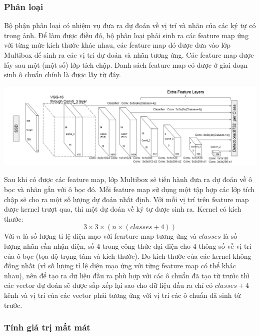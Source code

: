 \documentclass[a4paper,12pt]{article}
\begin{document}
	\subsubsection* {Phân loại}
	
	Bộ phận phân loại có nhiệm vụ đưa ra dự đoán về vị trí và nhãn của các ký tự có trong ảnh. Để làm được điều đó, bộ phân loại phải sinh ra các feature map ứng với từng mức kích thước khác nhau, các feature map đó được đưa vào lớp Multibox để sinh ra các vị trí dự đoán và nhãn tương ứng. Các feature map được lấy sau một (một số) lớp tích chập. Danh sách feature map có được ở giai đoạn sinh ô chuẩn chính là được lấy từ đây. \\
	
	\begin{center}
		
		\centering
		\includegraphics[width=0.8\linewidth]{SSD_Struture.png}
		\vspace{0.5cm}
	\end{center}
	
	Sau khi có được các feature map, lớp Multibox sẽ tiến hành đưa ra dự đoán về ô bọc và nhãn gắn với ô bọc đó. Mỗi feature map sử dụng một tập hợp các lớp tích chập sẽ cho ra một số lượng dự đoán nhất định. Với mỗi vị trí trên feature map được kernel trượt qua, thì một dự đoán về ký tự được sinh ra. Kernel có kích thước:
	$$3 \times 3 \times (n \times (classes + 4))$$
	Với $n$ là số lượng tỉ lệ diện mạo với fearture map tương ứng và $classes$ là số lượng nhãn cần nhận diện, số $4$ trong công thức đại diện cho 4 thông số về vị trí của ô bọc (tọa độ trọng tâm và kích thước). Do kích thước của các kernel không đồng nhất (vì số lượng tỉ lệ diện mạo ứng với từng feature map có thể khác nhau), nên để tạo ra dữ liệu đầu ra phù hợp với các ô chuẩn đã tạo từ trước thì các vector dự đoán sẽ được sắp xếp lại sao cho dữ liệu đầu ra chỉ có $classes + 4$ kênh và vị trí của các vector phải tương ứng với vị trí các ô chuẩn đã sinh từ trước.
	
	\subsubsection{Tính giá trị mất mát}
	
\end{document}
